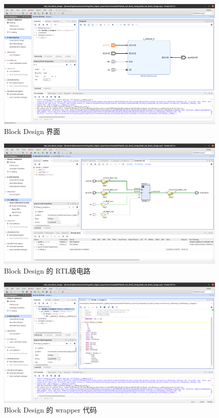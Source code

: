\documentclass[11pt]{SEU-Digital-Report}
\begin{document}
        \begin{figure}[htbp]
          \centering
          \includegraphics[width=\linewidth]{fig/BS.png}
          \caption{Block Design 界面}
          \label{fig:BS}
        \end{figure}

        \begin{figure}[htbp]
          \centering
          \includegraphics[width=\linewidth]{fig/BS_RTL.png}
          \caption{Block Design 的 RTL级电路}
          \label{fig:BS_RTL}
        \end{figure}

        \clearpage
        \begin{figure}[htbp]
          \centering
          \includegraphics[width=\linewidth]{fig/BS_wrapper.png}
          \caption{Block Design 的 wrapper 代码}
          \label{fig:BS_wrapper}
        \end{figure}
\end{document}
